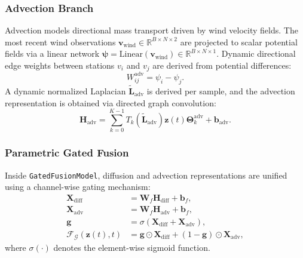 \documentclass[conference]{IEEEtran}
\begin{document}
\subsubsection{Advection Branch}
Advection models directional mass transport driven by wind velocity fields. The most recent wind observations $\boldsymbol{v}_{\text{wind}} \in \mathbb{R}^{B \times N \times 2}$ are projected to scalar potential fields via a linear network $\boldsymbol{\psi} = \text{Linear}(\boldsymbol{v}_{\text{wind}}) \in \mathbb{R}^{B \times N \times 1}$. Dynamic directional edge weights between stations $v_i$ and $v_j$ are derived from potential differences:
\begin{equation}
W^{\text{adv}}_{ij} = \psi_i - \psi_j.
\label{eq:adv_weights}
\end{equation}
A dynamic normalized Laplacian $\widetilde{\boldsymbol{L}}_{\text{adv}}$ is derived per sample, and the advection representation is obtained via directed graph convolution:
\begin{equation}
\boldsymbol{H}_{\text{adv}} = \sum_{k=0}^{K-1} T_k(\widetilde{\boldsymbol{L}}_{\text{adv}}) \boldsymbol{z}(t) \boldsymbol{\Theta}^{\text{adv}}_k + \boldsymbol{b}_{\text{adv}}.
\label{eq:cheb_adv}
\end{equation}

\subsubsection{Parametric Gated Fusion}
Inside \texttt{GatedFusionModel}, diffusion and advection representations are unified using a channel-wise gating mechanism:
\begin{align}
\boldsymbol{X}_{\text{diff}} &= \boldsymbol{W}_f \boldsymbol{H}_{\text{diff}} + \boldsymbol{b}_f, \label{eq:gate_1} \\
\boldsymbol{X}_{\text{adv}} &= \boldsymbol{W}_f \boldsymbol{H}_{\text{adv}} + \boldsymbol{b}_f, \label{eq:gate_2} \\
\boldsymbol{g} &= \sigma(\boldsymbol{X}_{\text{diff}} + \boldsymbol{X}_{\text{adv}}), \label{eq:gate_3} \\
\mathcal{F}_{\mathcal{G}}(\boldsymbol{z}(t), t) &= \boldsymbol{g} \odot \boldsymbol{X}_{\text{diff}} + (1 - \boldsymbol{g}) \odot \boldsymbol{X}_{\text{adv}}, \label{eq:gate_4}
\end{align}
where $\sigma(\cdot)$ denotes the element-wise sigmoid function.
\end{document}
